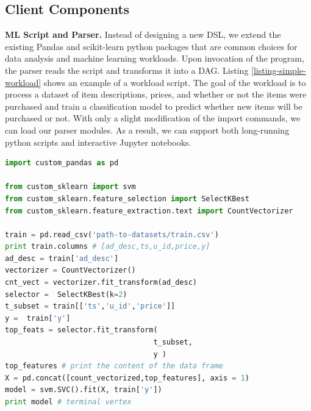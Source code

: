 \subsection{Client Components}
\textbf{ML Script and Parser.}
Instead of designing a new DSL, we extend the existing Pandas and scikit-learn \cite{sklearn_api} python packages that are common choices for data analysis and machine learning workloads.
Upon invocation of the program, the parser reads the script and transforms it into a DAG.
Listing \ref{listing-simple-workload} shows an example of a workload script.
The goal of the workload is to process a dataset of item descriptions, prices, and whether or not the items were purchased and train a classification model to predict whether new items will be purchased or not.
With only a slight modification of the import commands, we can load our parser modules.
As a result, we can support both long-running python scripts and interactive Jupyter notebooks.
\begin{lstlisting}[language=Python, caption=Example script,captionpos=b,label = {listing-simple-workload}]
import custom_pandas as pd

from custom_sklearn import svm
from custom_sklearn.feature_selection import SelectKBest
from custom_sklearn.feature_extraction.text import CountVectorizer

train = pd.read_csv('path-to-datasets/train.csv') 
print train.columns # [ad_desc,ts,u_id,price,y]
ad_desc = train['ad_desc']
vectorizer = CountVectorizer()
cnt_vect = vectorizer.fit_transform(ad_desc)
selector =  SelectKBest(k=2)
t_subset = train[['ts','u_id','price']]
y =  train['y']
top_feats = selector.fit_transform(
                                  t_subset,  
                                  y )
top_features # print the content of the data frame		     
X = pd.concat([count_vectorized,top_features], axis = 1)
model = svm.SVC().fit(X, train['y'])
print model # terminal vertex
\end{lstlisting}

